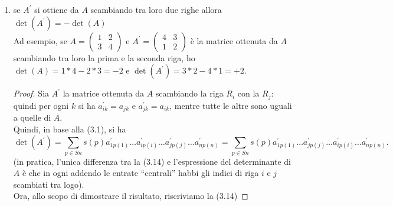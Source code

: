 \documentclass{book}
\begin{document}
\begin{enumerate}
\begin{proof}
			allora la riga i-esima della matrice\\
			$A^\prime$ è $R_i+v+\begin{pmatrix}a_{i1}+v_{i1} & a_{i2}+v_{i2} & 
			\dots & a_{in}+v_{in}\end{pmatrix}$
			In base alla definizione (<++>) di determinante, si ha
			$\det(A^\prime)=\sum s(p)a_{ip(1)}\dots (a_{ip(i)}+v_{ip(i)})\dots a
			_{np(n)}=\sum s(p)a_{ip(1)}\dots a_{ip(i)}\dots a_{np(n)}+\sum s(p)a
			_{ip(1)}\dots v_{ip(i)}\dots a_{np(n)}$ ovvero 
			$\det(A)+\det\begin{pmatrix}R_1\\ \dots\\ v\\ \dots\\ 
			R_n\end{pmatrix}$, come volevamo.
		\end{proof}
    \item se $A^\prime$ si ottiene da $A$ scambiando tra loro due righe allora $\det(A^\prime)=-\det(A)$\\
		Ad esempio, se $A=\begin{pmatrix} 1 & 2 \\ 3 & 4 \end{pmatrix}$ e
			  $A^{\prime}=\begin{pmatrix} 4 & 3 \\ 1 & 2 \end{pmatrix}$ è la
			  matrice ottenuta da $A$ scambiando tra loro la prima e la seconda
			  riga, ho $\det(A)=1*4-2*3=-2$ e $\det(A^\prime)=3*2-4*1=+2$.
		\begin{proof}
			Sia $A^\prime$ la matrice ottenuta da $A$ scambiando la riga $R_i$
			con la $R_j$: quindi per ogni $k$ si ha $a^\prime_{ik}=a_{jk}$ e
			$a^\prime_{jk}=a_{ik}$, mentre tutte le altre sono uguali a quelle
			di $A$.\\
			Quindi, in base alla (3.1), si ha
			\begin{equation}
				\det(A^\prime) = \sum_{p\in Sn} s(p) a^\prime_{1p(1)}\dots
				a^\prime_{ip(i)}\dots a^\prime_{jp(j)}\dots a^\prime_{np(n)} =
				\sum_{p\in Sn} s(p) a^\prime_{1p(1)}\dots
				a^\prime_{jp(j)}\dots a^\prime_{ip(i)}\dots a^\prime_{np(n)}.
			\end{equation}
			(in pratica, l'unica differenza tra la (3.14) e l'espressione del
			determinante di $A$ è che in ogni addendo le entrate ``centrali''
			habbi gli indici di riga $i$ e $j$ scambiati tra logo).\\
			Ora, allo scopo di dimostrare il risultato, riscriviamo la (3.14)

\end{proof}
\end{enumerate}
\end{document}
